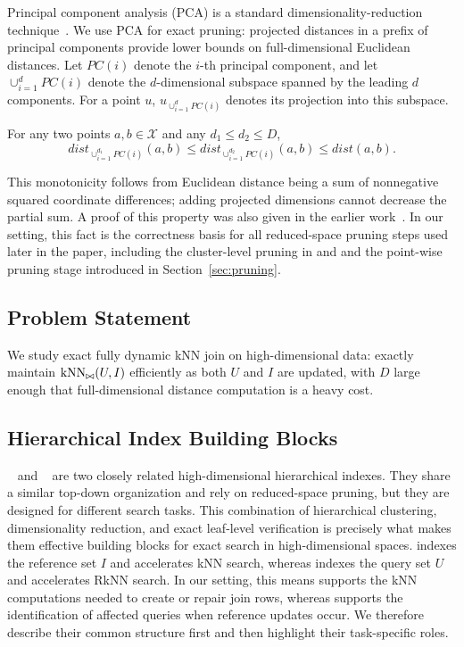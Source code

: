 Principal component analysis (PCA) is a standard dimensionality-reduction technique~\cite{wold1987principal,chakrabarti2000local,abdi2010principal,vidal2016principal}. We use PCA for exact pruning: projected distances in a prefix of principal components provide lower bounds on full-dimensional Euclidean distances. Let $PC(i)$ denote the $i$-th principal component, and let $\cup_{i=1}^{d}PC(i)$ denote the $d$-dimensional subspace spanned by the leading $d$ components. For a point $u$, $u_{\cup_{i=1}^{d}PC(i)}$ denotes its projection into this subspace.

\begin{lemma}\label{lm:pca_decrease_dist}\label{thm:distance_pca}
For any two points $a,b\in\mathcal{X}$ and any $d_1\le d_2\le D$,
\[
dist_{\cup_{i=1}^{d_1}PC(i)}(a,b)
\le
dist_{\cup_{i=1}^{d_2}PC(i)}(a,b)
\le
dist(a,b).
\]
\end{lemma}

This monotonicity follows from Euclidean distance being a sum of nonnegative squared coordinate differences; adding projected dimensions cannot decrease the partial sum. A proof of this property was also given in the earlier work~\cite{ukey2023efficient}. In our setting, this fact is the correctness basis for all reduced-space pruning steps used later in the paper, including the cluster-level pruning in \deltatree and \hdrtree and the point-wise pruning stage introduced in Section~\ref{sec:pruning}.

\subsection{Problem Statement}\label{sec:problem-statement}

We study exact fully dynamic kNN join on high-dimensional data: exactly maintain $\operatorname{kNN}_{\bowtie}(U,I)$ efficiently as both $U$ and $I$ are updated, with $D$ large enough that full-dimensional distance computation is a heavy cost.

\subsection{Hierarchical Index Building Blocks}\label{sec:index-building-blocks}

\deltatree~\cite{cui2003contorting} and \hdrtree~\cite{yang2014continuous} are two closely related high-dimensional hierarchical indexes. They share a similar top-down organization and rely on reduced-space pruning, but they are designed for different search tasks. This combination of hierarchical clustering, dimensionality reduction, and exact leaf-level verification is precisely what makes them effective building blocks for exact search in high-dimensional spaces. \deltatree indexes the reference set $I$ and accelerates kNN search, whereas \hdrtree indexes the query set $U$ and accelerates RkNN search. In our setting, this means \deltatree supports the kNN computations needed to create or repair join rows, whereas \hdrtree supports the identification of affected queries when reference updates occur. We therefore describe their common structure first and then highlight their task-specific roles.

